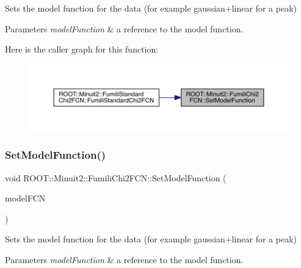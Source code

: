 Sets the model function for the data (for example gaussian+linear for a peak)


\begin{DoxyParams}{Parameters}
{\em model\+Function} & a reference to the model function. \\
\hline
\end{DoxyParams}
Here is the caller graph for this function\+:
\nopagebreak
\begin{figure}[H]
\begin{center}
\leavevmode
\includegraphics[width=350pt]{d3/df0/classROOT_1_1Minuit2_1_1FumiliChi2FCN_a0db1c6dd4cbdc96107490f572cce20da_icgraph}
\end{center}
\end{figure}
\mbox{\label{classROOT_1_1Minuit2_1_1FumiliChi2FCN_a0db1c6dd4cbdc96107490f572cce20da}} 
\subsubsection{\texorpdfstring{SetModelFunction()}{SetModelFunction()}\hspace{0.1cm}{\footnotesize\ttfamily [2/3]}}
{\footnotesize\ttfamily void R\+O\+O\+T\+::\+Minuit2\+::\+Fumili\+Chi2\+F\+C\+N\+::\+Set\+Model\+Function (\begin{DoxyParamCaption}\item[{const \mbox{\hyperlink{classROOT_1_1Minuit2_1_1ParametricFunction}{Parametric\+Function}} \&}]{model\+F\+CN }\end{DoxyParamCaption})\hspace{0.3cm}{\ttfamily [inline]}}

Sets the model function for the data (for example gaussian+linear for a peak)


\begin{DoxyParams}{Parameters}
{\em model\+Function} & a reference to the model function. \\
\hline
\end{DoxyParams}
\mbox{\label{classROOT_1_1Minuit2_1_1FumiliChi2FCN_a0db1c6dd4cbdc96107490f572cce20da}} 
